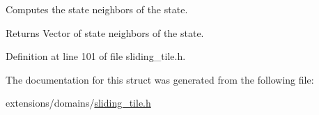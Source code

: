 Computes the state neighbors of the state. 

\begin{DoxyReturn}{Returns}
Vector of state neighbors of the state. 
\end{DoxyReturn}


Definition at line 101 of file sliding\+\_\+tile.\+h.



The documentation for this struct was generated from the following file\+:\begin{DoxyCompactItemize}
\item 
extensions/domains/\hyperlink{sliding__tile_8h}{sliding\+\_\+tile.\+h}\end{DoxyCompactItemize}
